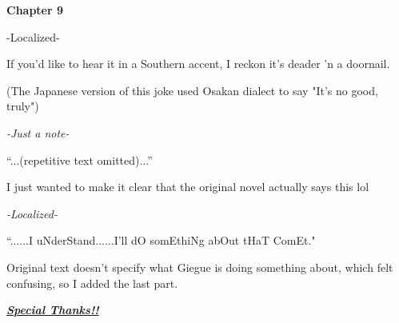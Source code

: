 \documentclass[
]{article}
\begin{document}
\textbf{Chapter 9}

-Localized-

If you'd like to hear it in a Southern accent, I reckon it's deader 'n a
doornail.

(The Japanese version of this joke used Osakan dialect to say "It's no
good, truly")

\emph{-Just a note-}

``...(repetitive text omitted)...''

I just wanted to make it clear that the original novel actually says
this lol

\emph{-Localized-}

``......I uNderStand......I'll dO somEthiNg abOut tHaT ComEt."

Original text doesn't specify what Giegue is doing something about,
which felt confusing, so I added the last part.

\href{https://docs.google.com/document/d/1pwDBXILccVSOOD4pL1NfYnqMHiJ8R3cIv4NwrqQ0p-M/edit?usp=sharing}{\emph{\textbf{Special
Thanks!!}}}
\end{document}

